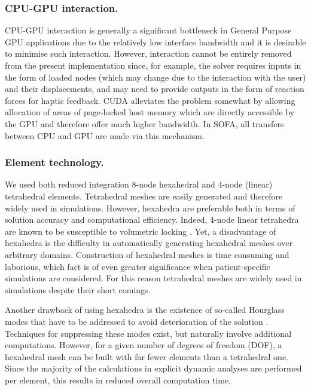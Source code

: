 \subsubsection*{CPU-GPU interaction.}
CPU-GPU interaction is generally a significant bottleneck in General Purpose GPU applications due to the relatively low interface bandwidth and it is desirable to minimise such interaction. However, interaction cannot be entirely removed from the present implementation since, for example, the solver requires inputs in the form of loaded nodes (which may change due to the interaction with the user) and their displacements, and may need to provide outputs in the form of reaction forces for haptic feedback. CUDA alleviates the problem somewhat by allowing allocation of areas of page-locked host memory which are directly accessible by the GPU and therefore offer much higher bandwidth. In SOFA, all transfers between CPU and GPU are made via this mechanism.

\subsubsection*{Element technology.}
We used both reduced integration 8-node hexahedral and 4-node (linear) tetrahedral elements. Tetrahedral meshes are easily generated and therefore widely used in simulations. However, hexahedra are preferable both in terms of solution accuracy and computational efficiency. Indeed, 4-node linear tetrahedra are known to be susceptible to volumetric locking \citep{Hughes00}.  Yet, a disadvantage of hexahedra is the difficulty in automatically generating hexahedral meshes over arbitrary domains. Construction of hexahedral meshes is time consuming and laborious, which fact is of even greater significance when patient-specific simulations are considered. For this reason tetrahedral meshes are widely used in simulations despite their short comings. 

Another drawback of using hexahedra is the existence of so-called Hourglass modes that have to be addressed to avoid deterioration of the solution \citep{Flanagan81}. Techniques for suppressing these modes exist, but naturally involve additional computations. However, for a given number of degrees of freedom (DOF), a hexahedral mesh can be built with far fewer elements than a tetrahedral one. Since the majority of the calculations in explicit dynamic analyses are performed per element, this results in reduced overall computation time.

